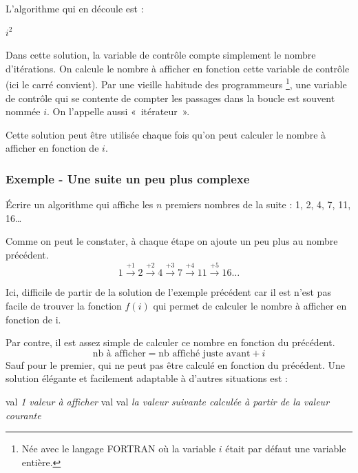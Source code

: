 		L'algorithme qui en découle est :
		
		\begin{LDA}
					\Write $i^2$
				\EndFor
			\EndAlgo
		\end{LDA}

		Dans cette solution,
		la variable de contrôle compte simplement le nombre d’itérations.
		On calcule le nombre à afficher en fonction cette variable de contrôle 
		(ici le carré convient).
		Par une vieille habitude des programmeurs%
		\footnote{%
			Née avec le langage FORTRAN 
			où la variable $i$ était par défaut une variable entière.
		},
		une variable de contrôle 
		qui se contente de compter les passages dans la boucle 
		est souvent nommée $i$. 
		On l’appelle aussi «~itérateur~».	

		Cette solution peut être utilisée
		chaque fois qu'on peut calculer le nombre à afficher
		en fonction de $i$.
		
	\subsubsection{Exemple - Une suite un peu plus complexe}
	 
		Écrire un algorithme qui affiche 
		les $n$ premiers nombres de la suite :
		1, 2, 4, 7, 11, 16\dots{}
		
		Comme on peut le constater, 
		à chaque étape on ajoute un peu plus au nombre précédent.
		\[ 
			1 
			\xrightarrow{+1} 2 
			\xrightarrow{+2} 4
			\xrightarrow{+3} 7 
			\xrightarrow{+4} 11 
			\xrightarrow{+5} 16 
			\dots
		\] 

		Ici, difficile de partir de la solution de l'exemple précédent
		car il est n'est pas facile de trouver la fonction $f(i)$
		qui permet de calculer le nombre à afficher en fonction de i. 
		
		Par contre, il est assez simple de calculer ce nombre 
		en fonction du précédent.
		\[
			\mbox{nb à afficher} = \mbox{nb affiché juste avant} + i
		\]
		Sauf pour le premier, qui ne peut pas être calculé
		en fonction du précédent.
		Une solution élégante et facilement adaptable
		à d'autres situations est :
		
		\begin{LDA}
			\Algo{suite}{\Par{n}{entier}}{}
				\Decl{val}{entier}
				\Let val \Gets \textit{1\iere{} valeur à afficher}
				\For{i}{1}{n}
					\Write val
					\Let val \Gets \textit{la valeur suivante calculée à partir de la valeur courante}
				\EndFor
			\EndAlgo
		\end{LDA}
		
